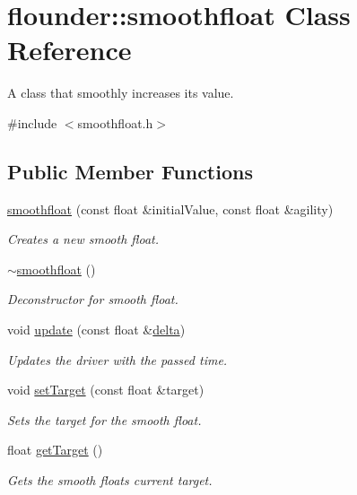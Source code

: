 \hypertarget{classflounder_1_1smoothfloat}{}\section{flounder\+:\+:smoothfloat Class Reference}
\label{classflounder_1_1smoothfloat}


A class that smoothly increases its value.  




{\ttfamily \#include $<$smoothfloat.\+h$>$}

\subsection*{Public Member Functions}
\begin{DoxyCompactItemize}
\item 
\hyperlink{classflounder_1_1smoothfloat_a4a893f989019e779fa377f6ef5576121}{smoothfloat} (const float \&initial\+Value, const float \&agility)
\begin{DoxyCompactList}\small\item\em Creates a new smooth float. \end{DoxyCompactList}\item 
\hyperlink{classflounder_1_1smoothfloat_a4d96e3fdb93fbbf9d28c788a1b7a4e58}{$\sim$smoothfloat} ()
\begin{DoxyCompactList}\small\item\em Deconstructor for smooth float. \end{DoxyCompactList}\item 
void \hyperlink{classflounder_1_1smoothfloat_a38b23a64dda6597576401026725dd535}{update} (const float \&\hyperlink{classflounder_1_1delta}{delta})
\begin{DoxyCompactList}\small\item\em Updates the driver with the passed time. \end{DoxyCompactList}\item 
void \hyperlink{classflounder_1_1smoothfloat_a4e860cb265fb463b281442ee6c8d3b57}{set\+Target} (const float \&target)
\begin{DoxyCompactList}\small\item\em Sets the target for the smooth float. \end{DoxyCompactList}\item 
float \hyperlink{classflounder_1_1smoothfloat_ae84a7b55d9c4f66f8613966c104213b2}{get\+Target} ()
\begin{DoxyCompactList}\small\item\em Gets the smooth floats current target. \end{DoxyCompactList}\item 

\end{DoxyCompactItemize}

